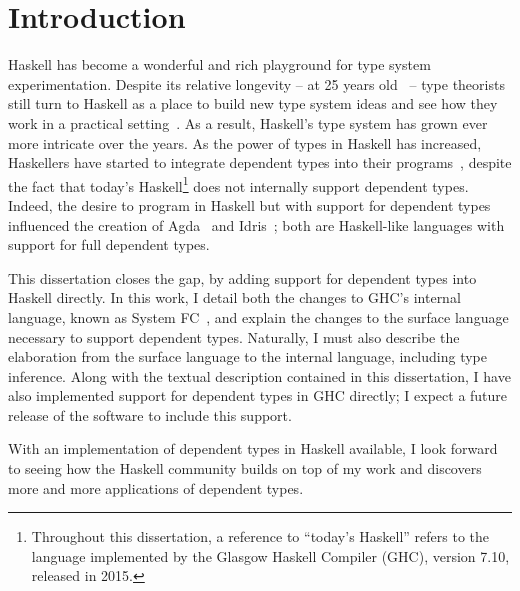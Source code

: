 \chapter{Introduction}

Haskell has become a wonderful and rich playground for type system
experimentation. Despite its relative longevity -- at 25 years
old~\cite{history-of-haskell}  -- type theorists still turn to
Haskell as a place to build new type system ideas and see how they work in a
practical setting~\cite{functional-dependencies, type-families, arrows, syb,
  closed-type-families, generics-with-closed-type-families, safe-coercions,
  pattern-match-and-gadts, helium-type-errors, etc}. As a result, Haskell's type system has grown
ever more intricate over the years. As the power of types in Haskell has
increased, Haskellers have started to integrate dependent types into their
programs~\cite{singletons, hasochism, she, clash, vinyl}, despite the fact
that today's Haskell\footnote{Throughout this dissertation, a reference to
  ``today's Haskell'' refers to the language implemented by the Glasgow
  Haskell Compiler (GHC), version 7.10, released in 2015.} does not internally
support dependent types. Indeed, the desire to program in Haskell but with
support for dependent types influenced the creation of Agda~\cite{agda} and
Idris~\cite{idris}; both are Haskell-like languages with support for full dependent
types.

This dissertation closes the gap, by adding support for dependent types into
Haskell directly. In this work, I detail both the changes to GHC's internal
language, known as System FC~\cite{system-fc}, and explain the changes to the
surface language necessary to support dependent types. Naturally, I must also
describe the elaboration from the surface language to the internal language,
including type inference. Along with the textual description contained in this
dissertation, I have also implemented support for dependent types in GHC directly;
I expect a future release of the software to include this support.

With an implementation of dependent types in Haskell available, I look forward
to seeing how the Haskell community builds on top of my work and discovers
more and more applications of dependent types.
